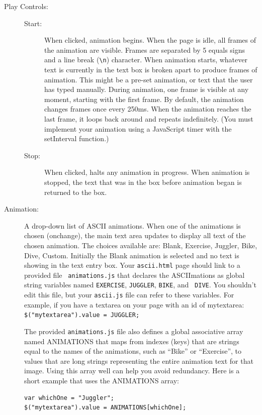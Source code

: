 \documentclass{article}
\begin{document}
\begin{description}
\item[Play Controls:]\mbox{}
  \begin{description}
\item[Start:] When clicked, animation begins.  When the page is idle,
  all frames of the animation are visible.  Frames are separated by 5
  equals signs and a line break (\verb|\n|) character.  When
  animation starts, whatever text is currently in the text box is
  broken apart to produce frames of animation.  This might be a
  pre-set animation, or text that the user has typed manually.  During
  animation, one frame is visible at any moment, starting with the
  first frame.  By default, the animation changes frames once every
  250ms.  When the animation reaches the last frame, it loops back
  around and repeats indefinitely.  (You must implement your animation
  using a JavaScript timer with the setInterval function.)
\item[Stop:] When clicked, halts any animation in progress.  When animation is stopped, the text that was in the box before animation began is returned to the box.
\end{description}
\item[Animation:] A drop-down list of ASCII animations. When one of
  the animations is chosen (onchange), the main text area updates to
  display all text of the chosen animation. The choices available are:
  Blank, Exercise, Juggler, Bike, Dive, Custom.  Initially the Blank
  animation is selected and no text is showing in the text entry box.
  Your {\tt ascii.html} page should link to a provided file {\tt
    animations.js} that declares the ASCIImations as global string
  variables named {\tt EXERCISE}, {\tt JUGGLER}, {\tt BIKE}, and {\tt
    DIVE}. You shouldn't edit this file, but your {\tt ascii.js} file
  can refer to these variables. For example, if you have a textarea on
  your page with an id of mytextarea:
  \verb|$("mytextarea").value = JUGGLER;|

The provided {\tt animations.js} file also defines a global
associative array named ANIMATIONS that maps from indexes (keys) that
are strings equal to the names of the animations, such as ``Bike'' or
``Exercise'', to values that are long strings representing the entire
animation text for that image.  Using this array well can help you
avoid redundancy.  Here is a short example that uses the ANIMATIONS
array:
\begin{Verbatim}[frame=single]
var whichOne = "Juggler"; 
$("mytextarea").value = ANIMATIONS[whichOne];
\end{Verbatim}


\end{description}
\end{document}
